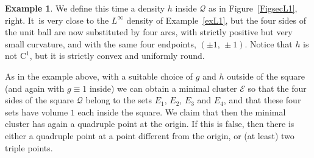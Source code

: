 \documentclass[10pt]{amsart}
\newcommand\Q{\mathcal{Q}}
\newcommand\E{\mathcal{E}}
\theoremstyle{plain}
\theoremstyle{definition}
\newtheorem{example}[thm]{Example}
\begin{document}
\begin{example}\label{exL2}
We define this time a density $h$ inside $\Q$ as in Figure~\ref{FigsecL1}, right. It~is very close to the $L^\infty$ density of Example~\ref{exL1}, but the four sides of the unit ball are now substituted by four arcs, with strictly positive but very small curvature, and with the same four endpoints, \ie $(\pm 1,\,\pm 1)$. Notice that $h$ is not $\mathrm{C}^1$, but it is strictly convex and uniformly round.

As in the example above, with a suitable choice of $g$ and $h$ outside of the square (and again with $g\equiv 1$ inside) we can obtain a minimal cluster $\E$ so that the four sides of the square $\Q$ belong to the sets $E_1$, $E_2$, $E_3$ and $E_4$, and that these four sets have volume $1$ each inside the square. We claim that then the minimal cluster has again a quadruple point at the origin. If this is false, then there is either a quadruple point at a point different from the origin, or (at least) two triple points.


\end{example}
\end{document}
